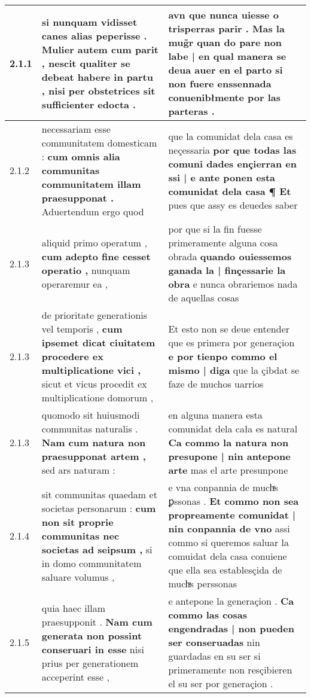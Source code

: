 \begin{tabular}{|p{1cm}|p{6.5cm}|p{6.5cm}|}
2.1.1 & si nunquam vidisset canes alias peperisse . \textbf{ Mulier autem cum parit , nescit qualiter se debeat habere in partu , } nisi per obstetrices sit sufficienter edocta . & avn que nunca uiesse o trisperras parir . \textbf{ Mas la mug̃r quan do pare non labe | en qual manera se deua auer en el parto } si non fuere enssennada conuenibłmente por las parteras . \\\hline
2.1.2 & necessariam esse communitatem domesticam : \textbf{ cum omnis alia communitas communitatem illam praesupponat . } Aduertendum ergo quod & que la comunidat dela casa es neçessaria \textbf{ por que todas las comuni dades ençierran en ssi | e ante ponen esta comunidat dela casa ¶ Et } pues que assy es deuedes saber \\\hline
2.1.3 & aliquid primo operatum , \textbf{ cum adepto fine cesset operatio , } nunquam operaremur ea , & por que si la fin fuesse primeramente alguna cosa obrada \textbf{ quando ouiessemos ganada la | finçessarie la obra } e nunca obrariemos nada de aquellas cosas \\\hline
2.1.3 & de prioritate generationis vel temporis , \textbf{ cum ipsemet dicat ciuitatem procedere ex multiplicatione vici , } sicut et vicus procedit ex multiplicatione domorum , & Et esto non se deue entender que es primera por generaçion \textbf{ e por tienpo commo el mismo | diga } que la çibdat se faze de muchos uarrios \\\hline
2.1.3 & quomodo sit huiusmodi communitas naturalis . \textbf{ Nam cum natura non praesupponat artem , } sed ars naturam : & en alguna manera esta comunidat dela cała es natural \textbf{ Ca commo la natura non presupone | nin antepone arte } mas el arte presunpone \\\hline
2.1.4 & sit communitas quaedam et societas personarum : \textbf{ cum non sit proprie communitas nec societas ad seipsum , } si in domo communitatem saluare volumus , & e vna conpannia de muchͣs ꝑssonas . \textbf{ Et commo non sea propreamente comunidat | nin conpannia de vno } assi commo si queremos saluar la comuidat dela casa conuiene que ella sea establesçida de muchͣs perssonas \\\hline
2.1.5 & quia haec illam praesupponit . \textbf{ Nam cum generata non possint conseruari in esse } nisi prius per generationem acceperint esse , & e antepone la generaçion . \textbf{ Ca commo las cosas engendradas | non pueden ser conseruadas } nin guardadas en su ser si primeramente non resçibieren el su ser por generaçion . \\\hline

\end{tabular}
